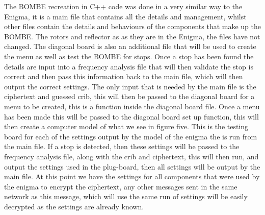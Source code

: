 \documentclass[12pt,a4paper]{article}
\begin{document}
The BOMBE recreation in C++ code was done in a very similar way to the Enigma, it is a main file that contains all the details and management, whilst other files contain the details and behaviours of the components that make up the BOMBE. The rotors and reflector as as they are in the Enigma, the files have not changed. The diagonal board is also an additional file that will be used to create the menu as well as test the BOMBE for stops. Once a stop has been found the details are input into a frequency analysis file that will then validate the stop is correct and then pass this information back to the main file, which will then output the correct settings. The only input that is needed by the main file is the ciphertext and guessed crib, this will then be passed to the diagonal board for a menu to be created, this is a function inside the diagonal board file. Once a menu has been made this will be passed to the diagonal board set up function, this will then create a computer model of what we see in figure five. This is the testing board for each of the settings output by the model of the enigma the is run from the main file. If a stop is detected, then these settings will be passed to the frequency analysis file, along with the crib and ciphertext, this will then run, and output the settings used in the plug-board, then all settings will be output by the main file. At this point we have the settings for all components that were used by the enigma to encrypt the ciphertext, any other messages sent in the same network as this message, which will use the same run of settings will be easily decrypted as the settings are already known.\\
\end{document}
